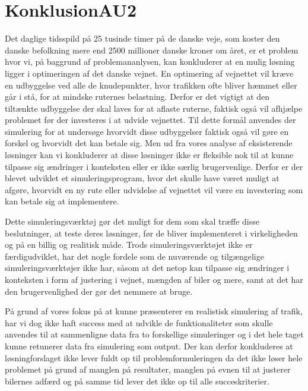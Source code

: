 \chapter{KonklusionAU2}\label{Konklusion}
Det daglige tidsspild på 25 tusinde timer på de danske veje, som koster den danske befolkning mere end 2500 millioner danske kroner om året, er et problem hvor vi, på baggrund af problemananlysen, kan konkluderer at en mulig løsning ligger i optimeringen af det danske vejnet. En optimering af vejnettet vil kræve en udbyggelse ved alle de knudepunkter, hvor trafikken ofte bliver hæmmet eller går i stå, for at mindske ruternes belastning. Derfor er det vigtigt at den tiltænkte udbyggelse der skal laves for at aflaste ruterne, faktisk også vil afhjælpe problemet før der investeres i at udvide vejnettet. Til dette formål anvendes der simulering for at undersøge hvorvidt disse udbyggelser faktisk også vil gøre en forskel og hvorvidt det kan betale sig. Men ud fra vores analyse af eksisterende løsninger kan vi konkluderer at disse løsninger ikke er fleksible nok til at kunne tilpasse sig ændringer i konteksten eller er ikke særlig brugervenlige. Derfor er der blevet udviklet et simuleringsprogram, hvor det skulle have været muligt at afgøre, hvorvidt en ny rute eller udvidelse af vejnettet vil være en investering som kan betale sig at implementere. 

\vspace{5mm}
 Dette simuleringsværktøj gør det muligt for dem som skal træffe disse beslutninger, at teste deres løsninger, før de bliver implementeret i virkeligheden og på en billig og realitisk måde. Trods simuleringsværktøjet ikke er færdigudviklet, har det nogle fordele som de nuværende og tilgængelige  simuleringsværktøjer ikke har, såsom at det netop kan tilpasse sig ændringer i konteksten i form af justering i vejnet, mængden af biler og mere, samt at det har den brugervenlighed der gør det nemmere at bruge.

\vspace{5mm} 
På grund af vores fokus på at kunne præsenterer en realistisk simulering af trafik, har vi dog ikke haft success med at udvikle de funktionaliteter som skulle anvendes til at sammenligne data fra to forskellige simuleringer og i det hele taget kunne retunerer data fra simulering som output. Der kan derfor konkluderes at løsningforslaget ikke lever fuldt op til problemformuleringen da det ikke løser hele problemet på grund af manglen på resultater, manglen på evnen til at justerer bilernes adfærd og på samme tid lever det ikke op til alle succeskriterier. 